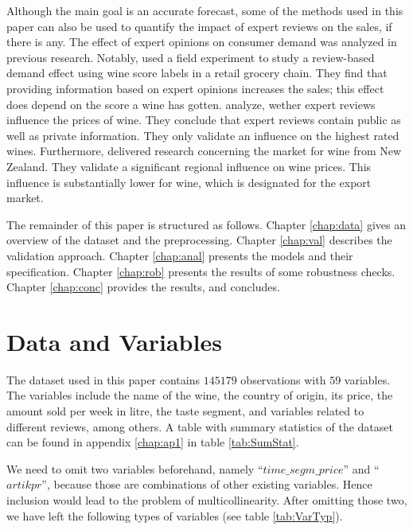 \documentclass[11pt,]{article}
\begin{document}
Although the main goal is an accurate forecast, some of the methods used
in this paper can also be used to quantify the impact of expert reviews
on the sales, if there is any. The effect of expert opinions on consumer
demand was analyzed in previous research. Notably,
\textcite[][p. 1289]{Hilger2011} used a field experiment to study a
review-based demand effect using wine score labels in a retail grocery
chain. They find that providing information based on expert opinions
increases the sales; this effect does depend on the score a wine has
gotten. \textcite[][p. 293]{Ashenfelter2013} analyze, wether expert
reviews influence the prices of wine. They conclude that expert reviews
contain public as well as private information. They only validate an
influence on the highest rated wines. Furthermore,
\textcite[][p. 182f.]{Bicknell2012} delivered research concerning the
market for wine from New Zealand. They validate a significant regional
influence on wine prices. This influence is substantially lower for
wine, which is designated for the export market.

The remainder of this paper is structured as follows. Chapter
\ref{chap:data} gives an overview of the dataset and the preprocessing.
Chapter \ref{chap:val} describes the validation approach. Chapter
\ref{chap:anal} presents the models and their specification. Chapter
\ref{chap:rob} presents the results of some robustness checks. Chapter
\ref{chap:conc} provides the results, and concludes.

\hypertarget{data-and-variables}{%
\section{\texorpdfstring{Data and Variables
\label{chap:data}}{Data and Variables }}\label{data-and-variables}}

The dataset used in this paper contains \(145179\) observations with
\(59\) variables. The variables include the name of the wine, the
country of origin, its price, the amount sold per week in litre, the
taste segment, and variables related to different reviews, among others.
A table with summary statistics of the dataset can be found in appendix
\ref{chap:ap1} in table \ref{tab:SumStat}.

We need to omit two variables beforehand, namely
\enquote{\(time\_segm\_price\)} and \enquote{\(artikpr\)}, because those
are combinations of other existing variables. Hence inclusion would lead
to the problem of multicollinearity. After omitting those two, we have
left the following types of variables (see table \ref{tab:VarTyp}).
\end{document}
